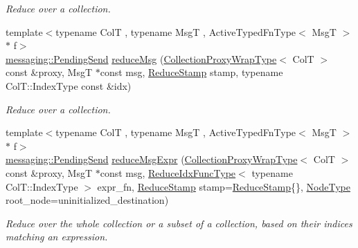 \begin{DoxyCompactItemize}
\begin{DoxyCompactList}\small\item\em Reduce over a collection. \end{DoxyCompactList}\item 
{\footnotesize template$<$typename ColT , typename MsgT , Active\+Typed\+Fn\+Type$<$ Msg\+T $>$ $\ast$ f$>$ }\\\hyperlink{structvt_1_1messaging_1_1_pending_send}{messaging\+::\+Pending\+Send} \hyperlink{structvt_1_1vrt_1_1collection_1_1_collection_manager_a47fe848e9c16d55bcefcbfeefa6b5597}{reduce\+Msg} (\hyperlink{structvt_1_1vrt_1_1collection_1_1_collection_manager_a56458ed7f9bb22b631b9b3a745f42f94}{Collection\+Proxy\+Wrap\+Type}$<$ ColT $>$ const \&proxy, MsgT $\ast$const msg, \hyperlink{structvt_1_1vrt_1_1collection_1_1_collection_manager_ae8aac19e0ae07e9225142e5880eac830}{Reduce\+Stamp} stamp, typename Col\+T\+::\+Index\+Type const \&idx)
\begin{DoxyCompactList}\small\item\em Reduce over a collection. \end{DoxyCompactList}\item 
{\footnotesize template$<$typename ColT , typename MsgT , Active\+Typed\+Fn\+Type$<$ Msg\+T $>$ $\ast$ f$>$ }\\\hyperlink{structvt_1_1messaging_1_1_pending_send}{messaging\+::\+Pending\+Send} \hyperlink{structvt_1_1vrt_1_1collection_1_1_collection_manager_a784c4fa10de6571dacfb587af3c90cb1}{reduce\+Msg\+Expr} (\hyperlink{structvt_1_1vrt_1_1collection_1_1_collection_manager_a56458ed7f9bb22b631b9b3a745f42f94}{Collection\+Proxy\+Wrap\+Type}$<$ ColT $>$ const \&proxy, MsgT $\ast$const msg, \hyperlink{structvt_1_1vrt_1_1collection_1_1_collection_manager_a47a3227ae0195c15187e8dc8762f66c4}{Reduce\+Idx\+Func\+Type}$<$ typename Col\+T\+::\+Index\+Type $>$ expr\+\_\+fn, \hyperlink{structvt_1_1vrt_1_1collection_1_1_collection_manager_ae8aac19e0ae07e9225142e5880eac830}{Reduce\+Stamp} stamp=\hyperlink{structvt_1_1vrt_1_1collection_1_1_collection_manager_ae8aac19e0ae07e9225142e5880eac830}{Reduce\+Stamp}\{\}, \hyperlink{namespacevt_a866da9d0efc19c0a1ce79e9e492f47e2}{Node\+Type} root\+\_\+node=uninitialized\+\_\+destination)
\begin{DoxyCompactList}\small\item\em Reduce over the whole collection or a subset of a collection, based on their indices matching an expression. \end{DoxyCompactList}\item 

\end{DoxyCompactItemize}
